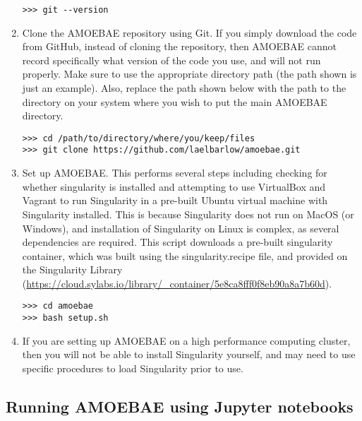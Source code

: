 \documentclass[12pt,letterpaper]{article}
\begin{document}
\begin{linenumbers}
\begin{enumerate}
\begin{lstlisting}
>>> git --version
\end{lstlisting}

\item Clone the AMOEBAE repository using Git. If you simply download the code
    from GitHub, instead of cloning the repository, then AMOEBAE cannot record
        specifically what version of the code you use, and will not run
        properly. Make sure to use the appropriate directory path (the path
        shown is just an example). Also, replace the path shown below with
        the path to the directory on your system where you wish to put the main
        AMOEBAE directory.

\begin{lstlisting}
>>> cd /path/to/directory/where/you/keep/files
>>> git clone https://github.com/laelbarlow/amoebae.git
\end{lstlisting}

\item Set up AMOEBAE. This performs several steps including checking for
    whether singularity is installed and attempting to use VirtualBox and
        Vagrant to run Singularity in a pre-built Ubuntu virtual machine with
        Singularity installed. This is because Singularity does not run on
        MacOS (or Windows), and installation of Singularity on Linux is
        complex, as several dependencies are required. This script downloads
        a pre-built singularity container, which was built using the
        singularity.recipe file, and provided on the Singularity Library
        (\url{https://cloud.sylabs.io/library/_container/5e8ca8fff0f8eb90a8a7b60d}).

\begin{lstlisting}
>>> cd amoebae
>>> bash setup.sh
\end{lstlisting}


\item If you are setting up AMOEBAE on a high performance computing cluster,
    then you will not be able to install Singularity yourself, and may need to
        use specific procedures to load Singularity prior to use.


\end{enumerate}

\subsection{Running AMOEBAE using Jupyter notebooks}
\label{jupyter_section}



\end{linenumbers}
\end{document}
